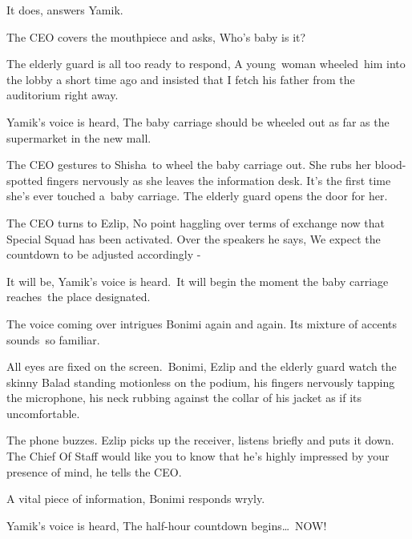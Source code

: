 \documentclass[letterpaper]{article}
\begin{document}
{\textquotedbl}It does,{\textquotedbl} answers Yamik\textcolor[rgb]{0.0,0.4392157,0.7529412}{.}

The CEO covers the mouthpiece and asks, {\textquotedbl}Who's baby is it?{\textquotedbl} \ 

The elderly guard is all too ready to respond, {\textquotedbl}A young\textcolor[rgb]{0.0,0.4392157,0.7529412}{\ }woman
wheeled\ him into the lobby a short time ago and insisted that I fetch his father from the auditorium right
away.{\textquotedbl} 

Yamik's voice is heard, {\textquotedbl}The baby carriage should be wheeled out as far as the supermarket in the new
mall.{\textquotedbl}\ 

The CEO gestures to Shisha~to wheel the baby carriage out. She rubs her blood-spotted fingers nervously as she leaves
the information desk. It's the first time she's ever touched a~baby carriage. The elderly guard opens the door for her.

The CEO turns to Ezlip, {\textquotedbl}No point haggling over terms of exchange now that Special Squad has been
activated.{\textquotedbl} Over the speakers he says, {\textquotedbl}We expect the countdown to be adjusted accordingly
-{\textquotedbl} 

{\textquotedbl}It will be,{\textquotedbl} Yamik's voice is heard.\ {\textquotedbl}It will begin the moment the baby
carriage reaches\textcolor[rgb]{0.0,0.4392157,0.7529412}{\ }the place designated.{\textquotedbl} 

The voice coming over intrigues Bonimi again and again. Its mixture of accents sounds\ so familiar.

All eyes are fixed on the screen.\textcolor[rgb]{0.0,0.4392157,0.7529412}{\ }Bonimi, Ezlip and the elderly guard watch
the skinny Balad standing motionless on the podium, his fingers nervously tapping the microphone, his neck rubbing
against the collar of his jacket as if its uncomfortable.

The phone buzzes. Ezlip picks up the receiver, listens briefly and puts it down. {\textquotedbl}The Chief Of Staff would
like you to know that he's highly impressed by your presence of mind,{\textquotedbl} he tells the CEO.

{\textquotedbl}A vital piece of information,{\textquotedbl} Bonimi responds wryly. 

Yamik's voice is heard, {\textquotedbl}The half-hour countdown
begins{\dots}\textcolor[rgb]{0.0,0.4392157,0.7529412}{\ }NOW!{\textquotedbl}
\end{document}
